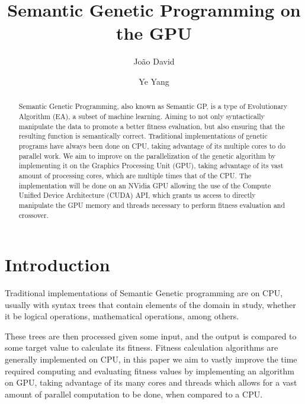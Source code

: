 \documentclass[runningheads]{llncs}
\begin{document}
\title{Semantic Genetic Programming on the GPU}
\author{João David \and
Ye Yang
}


\maketitle

\begin{abstract}
Semantic Genetic Programming, also known as Semantic GP, is a type of Evolutionary Algorithm (EA), a subset of machine learning. 
Aiming to not only syntactically manipulate the data to promote a better fitness evaluation, but also ensuring that the resulting function is semantically correct. Traditional implementations of genetic programs have always been done on CPU, taking advantage of its multiple cores to do parallel work. We aim to improve on the parallelization of the genetic algorithm by implementing it on the Graphics Processing Unit (GPU), taking advantage of its vast amount of processing cores, which are multiple times that of the CPU. The implementation will be done on an NVidia GPU allowing the use of the Compute Unified Device Architecture (CUDA) API, which grants us access to directly manipulate the GPU memory and threads necessary to perform fitness evaluation and crossover.


\end{abstract}
%
%
%
\section{Introduction}

Traditional implementations of Semantic Genetic programming are  on CPU, usually with syntax trees that contain elements of the domain in study, whether it be logical operations, mathematical operations, among others.

These trees are then processed given some input, and the output is compared to some target value to calculate its fitness. Fitness calculation algorithms are generally implemented on CPU, in this paper we aim to vastly improve the time required computing and evaluating fitness values by implementing an algorithm on GPU, taking advantage of its many cores and threads which allows for a vast amount of parallel computation to be done, when compared to a CPU.
\end{document}
